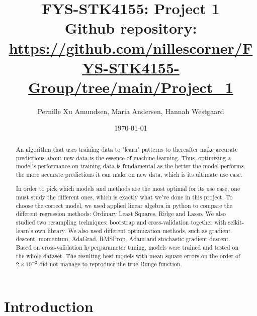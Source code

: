 \documentclass[reprint,english,notitlepage]{revtex4-2}  %
\begin{document}
\title{FYS-STK4155: Project 1 \\ \small Github repository: \url{https://github.com/nillescorner/FYS-STK4155-Group/tree/main/Project_1}}
\date{\today}               
\author{Pernille Xu Amundsen, Maria Andersen, Hannah Westgaard}



\newpage

\begin{abstract}
An algorithm that uses training data to "learn" patterns to thereafter make accurate predictions about new data is the essence of machine learning. 
Thus, optimizing a model's performance on training data is fundamental as the better the model performs, the more accurate predictions it can make on new data, 
which is its ultimate use case.

In order to pick which models and methods are the most optimal for its use case, one must study the different ones, which is exactly what we've done in this project.
To choose the correct model, we used applied linear algebra in python to compare the different regression methods: Ordinary Least Squares, Ridge and Lasso. 
We also studied two resampling techniques: bootstrap and cross-validation together with scikit-learn's own library. We also used different optimization methods, such as
gradient descent, momentum, AdaGrad, RMSProp, Adam and stochastic gradient descent. 
Based on cross-validation hyperparameter tuning, models were trained and tested on the whole dataset. The resulting best models with mean square errors on the order of $2\times10^{-2}$ did not manage to reproduce the true Runge function. 

\end{abstract}


\maketitle  %



\section{Introduction} \label{sec:Introduction}


\end{document}
